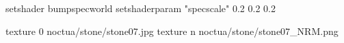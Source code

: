 setshader bumpspecworld
setshaderparam "specscale" 0.2 0.2 0.2

texture 0 noctua/stone/stone07.jpg
texture n noctua/stone/stone07_NRM.png

